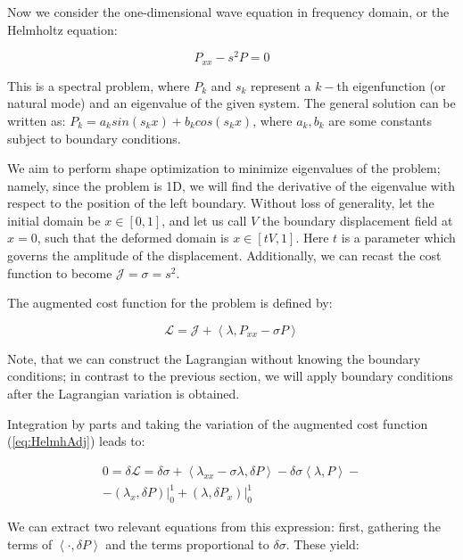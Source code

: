 Now we consider the one-dimensional wave equation in frequency domain, or the Helmholtz equation:

\begin{equation}
\label{eq:HelmholtzEq}
    P_{xx} - s^2 P = 0
\end{equation}

This is a spectral problem, where $P_k$ and $s_k$ represent a $k-$th eigenfunction (or natural mode) and an eigenvalue of the given system. The general solution can be written as: $P_k = a_k sin(s_k x) + b_k cos(s_k x)$, where $a_k, b_k$ are some constants subject to boundary conditions.

We aim to perform shape optimization to minimize eigenvalues of the problem; namely, since the problem is 1D, we will find the derivative of the eigenvalue with respect to the position of the left boundary. Without loss of generality, let the initial domain be $x \in [0,1]$, and let us call $V$ the boundary displacement field at $x = 0$, such that the deformed domain is $x \in [tV, 1]$. Here $t$ is a parameter which governs the amplitude of the displacement.  Additionally, we can recast the cost function to become $\mathcal{J} = \sigma = s^2$.

The augmented cost function for the problem is defined by:

\begin{equation}
\label{eq:HelmhAdj}
    \mathcal{L} = \mathcal{J} + \left<\lambda, P_{xx} - \sigma P \right>
\end{equation}

Note, that we can construct the Lagrangian without knowing the boundary conditions; in contrast to the previous section, we will apply boundary conditions after the Lagrangian variation is obtained.

Integration by parts and taking the variation of the augmented cost function (\ref{eq:HelmhAdj}) leads to:

\begin{subequations}
\begin{align}
    0 = \delta \mathcal{L} = \delta \sigma + \left<\lambda_{xx} - \sigma \lambda , \delta P \right> - \delta \sigma \left< \lambda, P \right> - \\
    - \left( \lambda_x , \delta P \right) \rvert^1_0 + \left( \lambda , \delta P_x \right) \rvert^1_0
\end{align}
\end{subequations}

We can extract two relevant equations from this expression: first, gathering the terms of $\left<\cdot , \delta P \right> $ and the terms proportional to $\delta \sigma$. These yield:

